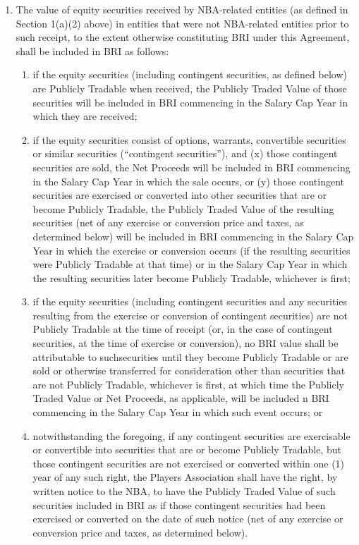 \documentclass[
]{book}
\providecommand{\tightlist}{%
  \setlength{\itemsep}{0pt}\setlength{\parskip}{0pt}}
\begin{document}
\begin{enumerate}
\begin{enumerate}
    \begin{enumerate}
    \def\labelenumiii{(\roman{enumiii})}
    \tightlist
    \item
      The value of equity securities received by NBA-related entities (as defined in Section 1(a)(2) above) in entities that were not NBA-related entities prior to such receipt, to the extent otherwise constituting BRI under this Agreement, shall be included in BRI as follows:

      \begin{enumerate}
      \def\labelenumiv{(\Alph{enumiv})}
      \tightlist
      \item
        if the equity securities (including contingent securities, as defined below) are Publicly Tradable when received, the Publicly Traded Value of those securities will be included in BRI commencing in the Salary Cap Year in which they are received;
      \item
        if the equity securities consist of options, warrants, convertible securities or similar securities (``contingent securities''), and (x) those contingent securities are sold, the Net Proceeds will be included in BRI commencing in the Salary Cap Year in which the sale occurs, or (y) those contingent securities are exercised or converted into other securities that are or become Publicly Tradable, the Publicly Traded Value of the resulting securities (net of any exercise or conversion price and taxes, as determined below) will be included in BRI commencing in the Salary Cap Year in which the exercise or conversion occurs (if the resulting securities were Publicly Tradable at that time) or in the Salary Cap Year in which the resulting securities later become Publicly Tradable, whichever is first;
      \item
        if the equity securities (including contingent securities and any securities resulting from the exercise or conversion of contingent securities) are not Publicly Tradable at the time of receipt (or, in the case of contingent securities, at the time of exercise or conversion), no BRI value shall be attributable to suchsecurities until they become Publicly Tradable or are sold or otherwise transferred for consideration other than securities that are not Publicly Tradable, whichever is first, at which time the Publicly Traded Value or Net Proceeds, as applicable, will be included n BRI commencing in the Salary Cap Year in which such event occurs; or
      \item
        notwithstanding the foregoing, if any contingent securities are exercisable or convertible into securities that are or become Publicly Tradable, but those contingent securities are not exercised or converted within one (1) year of any such right, the Players Association shall have the right, by written notice to the NBA, to have the Publicly Traded Value of such securities included in BRI as if those contingent securities had been exercised or converted on the date of such notice (net of any exercise or conversion price and taxes, as determined below).

\end{enumerate}
\end{enumerate}
\end{enumerate}
\end{enumerate}
\end{document}
